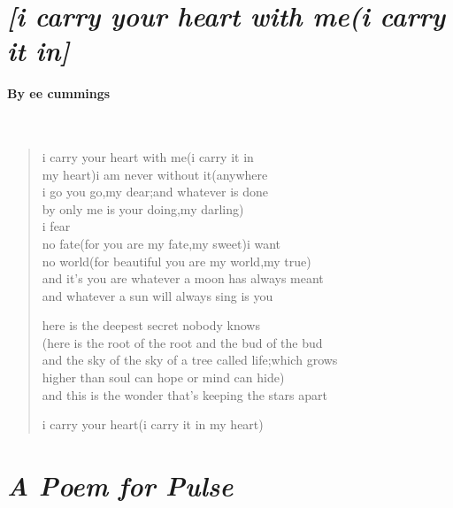 \documentclass[12pt, openany, letterpaper]{memoir}
\begin{document}
\mainmatter

\newpage
\newpage
\section*{\emph{[i carry your heart with me(i carry it in]}}
\paragraph{By ee cummings}~
\begin{verse}
	i carry your heart with me(i carry it in\\
	my heart)i am never without it(anywhere\\
	i go you go,my dear;and whatever is done\\
	by only me is your doing,my darling)\\
	\hspace{14em} i fear\\
	no fate(for you are my fate,my sweet)i want\\
	no world(for beautiful you are my world,my true)\\
	and it’s you are whatever a moon has always meant\\
	and whatever a sun will always sing is you
	
	here is the deepest secret nobody knows\\
	(here is the root of the root and the bud of the bud\\
	and the sky of the sky of a tree called life;which grows\\
	higher than soul can hope or mind can hide)\\
	and this is the wonder that's keeping the stars apart
	
	i carry your heart(i carry it in my heart)
\end{verse}


\newpage
\section*{\emph{A Poem for Pulse}}
\end{document}
